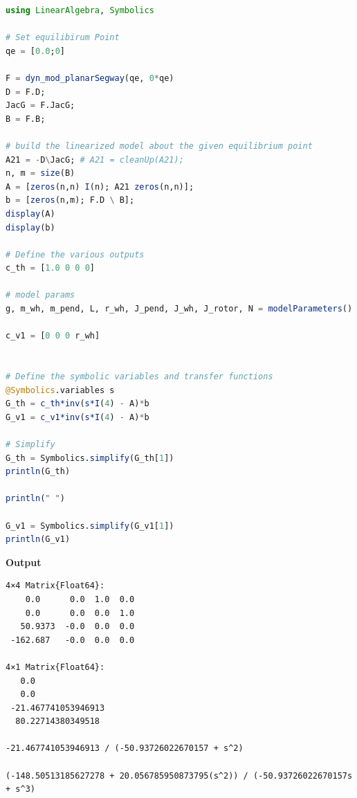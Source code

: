 \vspace*{.2cm}
\begin{lstlisting}[language=Julia,style=mystyle]
using LinearAlgebra, Symbolics

# Set equilibirum Point
qe = [0.0;0]

F = dyn_mod_planarSegway(qe, 0*qe)
D = F.D; 
JacG = F.JacG; 
B = F.B; 

# build the linearized model about the given equilibrium point
A21 = -D\JacG; # A21 = cleanUp(A21); 
n, m = size(B)
A = [zeros(n,n) I(n); A21 zeros(n,n)];
b = [zeros(n,m); F.D \ B];
display(A)
display(b)

# Define the various outputs
c_th = [1.0 0 0 0]

# model params
g, m_wh, m_pend, L, r_wh, J_pend, J_wh, J_rotor, N = modelParameters() 

c_v1 = [0 0 0 r_wh]


# Define the symbolic variables and transfer functions
@Symbolics.variables s
G_th = c_th*inv(s*I(4) - A)*b
G_v1 = c_v1*inv(s*I(4) - A)*b

# Simplify
G_th = Symbolics.simplify(G_th[1])
println(G_th)

println(" ")

G_v1 = Symbolics.simplify(G_v1[1])
println(G_v1)
\end{lstlisting}
\textbf{Output} 
\begin{verbatim}
4×4 Matrix{Float64}:
    0.0      0.0  1.0  0.0
    0.0      0.0  0.0  1.0
   50.9373  -0.0  0.0  0.0
 -162.687   -0.0  0.0  0.0
 
4×1 Matrix{Float64}:
   0.0
   0.0
 -21.467741053946913
  80.22714380349518
  
-21.467741053946913 / (-50.93726022670157 + s^2)
 
(-148.50513185627278 + 20.056785950873795(s^2)) / (-50.93726022670157s + s^3)

\end{verbatim}

\Qed

